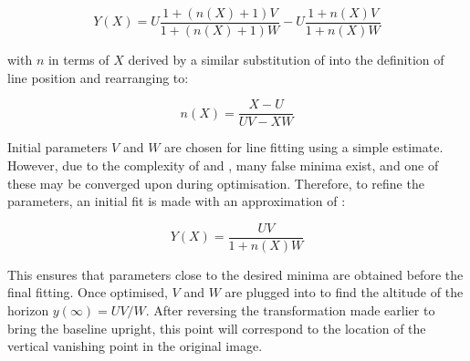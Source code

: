 \begin{equation}
Y(X) = U \frac{1+(n(X)+1)V}{1+(n(X)+1)W} - U \frac{1+n(X)V}{1+n(X)W}
\label{fittingeqn}
\end{equation}

{\parindent 0mm
with $n$ in terms of $X$ derived by a similar substitution of  into the definition of line position  and rearranging to:
}

\begin{equation}
n(X) = \frac{X-U}{UV-XW}
\label{nfromxeqn}
\end{equation}

Initial parameters $V$ and $W$ are chosen for line fitting using a simple estimate. %
However, due to the complexity of  and , many false minima exist, and one of these may be converged upon during optimisation.
Therefore, to refine the parameters, an initial fit is made with an approximation of :

\begin{equation}
Y(X) = \frac{ UV }{ 1+n(X)W }
\end{equation}

This ensures that parameters close to the desired minima are obtained before the final fitting.  Once optimised, $V$ and $W$ are plugged into  to find the altitude of the horizon $y(\infty) = UV/W$.
After reversing the transformation made earlier to bring the baseline upright, this point will correspond to the location of the vertical vanishing point in the original image.


